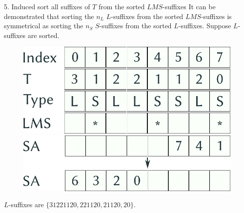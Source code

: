 \documentclass{beamer}
\begin{document}
  \begin{frame}{5. Induced sort all suffixes of $T$ from the sorted $LMS$-suffixes}
    It can be demonstrated that sorting the $n_L$ $L$-suffixes from the sorted $LMS$-suffixes is symmetrical as sorting the $n_S$ $S$-suffixes from the sorted $L$-suffixes. Suppose $L$-suffixes are sorted.

    \begin{figure}
      \centering
      \begin{minipage}{.5\textwidth}
        \centering
        \includegraphics[width=.9\linewidth]{img/preliminary.pdf}
      \end{minipage}%
      \begin{minipage}{.5\textwidth}
        \centering
        \includegraphics[width=.9\linewidth]{img/SA_5.pdf}
      \end{minipage}
    \end{figure}

    $L$-suffixes are $\{ 31221120, 221120, 21120, 20 \}$.

  \end{frame}
\end{document}
